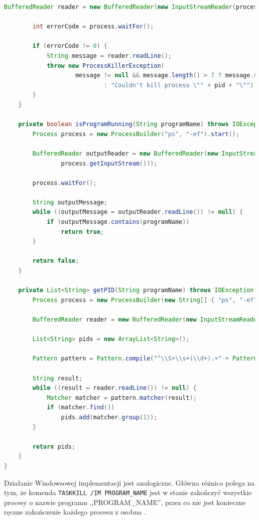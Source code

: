 \documentclass[polish,12pt,titlepage]{article}
\begin{document}
\begin{lstlisting}[language=Java, frame=lines, numberstyle=\tiny, stepnumber=5, caption=Implementacja \texttt{LinuxProcessKiller}., firstnumber=1]
        BufferedReader reader = new BufferedReader(new InputStreamReader(process.getErrorStream()));

        int errorCode = process.waitFor();

        if (errorCode != 0) {
            String message = reader.readLine();
            throw new ProcessKillerException(
                    message != null && message.length() > 7 ? message.substring(7, message.length())
                            : "Couldn't kill process \"" + pid + "\"");
        }
    }

    private boolean isProgramRunning(String programName) throws IOException, InterruptedException {
        Process process = new ProcessBuilder("ps", "-ef").start();

        BufferedReader outputReader = new BufferedReader(new InputStreamReader(
                process.getInputStream()));

        process.waitFor();

        String outputMessage;
        while ((outputMessage = outputReader.readLine()) != null) {
            if (outputMessage.contains(programName))
                return true;
        }

        return false;
    }

    private List<String> getPID(String programName) throws IOException {
        Process process = new ProcessBuilder(new String[] { "ps", "-ef" }).start();

        BufferedReader reader = new BufferedReader(new InputStreamReader(process.getInputStream()));

        List<String> pids = new ArrayList<String>();

        Pattern pattern = Pattern.compile("^\\S+\\s+(\\d+).+" + Pattern.quote(programName));

        String result;
        while ((result = reader.readLine()) != null) {
            Matcher matcher = pattern.matcher(result);
            if (matcher.find())
                pids.add(matcher.group(1));
        }

        return pids;
    }
}
\end{lstlisting}

Działanie Windowsowej implementacji jest analogiczne. Główna różnica polega na
tym, że komenda \texttt{TASKKILL /IM PROGRAM\_NAME} jest w stanie zakończyć
wszystkie procesy o nazwie programu ,,PROGRAM\_NAME'', przez co nie jest
konieczne ręczne zakończenie każdego procesu z osobna
\cite{WINDOWS_TERMINACJA}.
\end{document}
